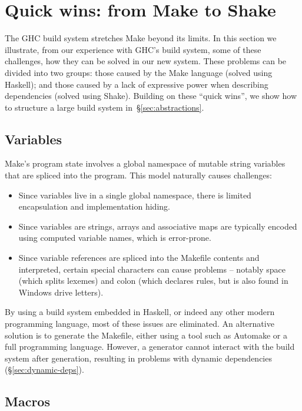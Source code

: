 \section{Quick wins: from Make to Shake\label{sec:solutions}}

The GHC build system stretches Make beyond its limits.
In this section we illustrate, from our experience with GHC's build system,
some of these challenges, how they can be solved in our new system.
These problems can be divided into two groups: those caused by the
Make language (solved using Haskell); and those caused by a lack of expressive
power when describing dependencies (solved using Shake).
Building on these ``quick wins'', we show how to structure a
large build system in~\S\ref{sec:abstractions}.

\subsection{Variables}

Make's program state involves a global namespace of mutable string variables that are
spliced into the program. This model naturally causes challenges:

\begin{itemize}
\item Since variables live in a single global namespace, there is limited
encapsulation and implementation hiding.
\item Since variables are strings, arrays and associative maps are typically
encoded using computed variable names, which is error-prone.
\item Since variable references are spliced into the Makefile contents
and interpreted, certain special characters can cause problems --
notably space (which splits lexemes) and colon (which declares rules, but is
also found in Windows drive letters).
\end{itemize}

\noindent By using a build system embedded in Haskell, or indeed any other
modern programming language, most of these issues are eliminated. An alternative solution is to generate the Makefile, either using a tool such as Automake or a full programming language. However, a generator cannot interact with the
build system after generation, resulting in problems with dynamic dependencies
(\S\ref{sec:dynamic-deps}).

\subsection{Macros\label{sec:pattern-rule-language}}

